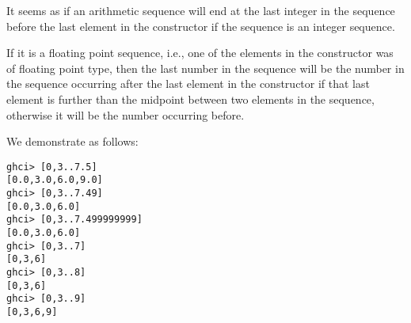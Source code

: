 
It seems as if an arithmetic sequence will end at the last 
integer in the sequence before the last element in the constructor if the 
sequence is an integer sequence.\par
\qquad If it is a floating point sequence, i.e., one of the elements in the 
constructor was of floating point type, then the last number in the sequence 
will be the number in the sequence occurring after the last element in the 
constructor if that last element is further than the midpoint between two 
elements in the sequence, otherwise it will be the number occurring before.\par
We demonstrate as follows:
\scriptsize\begin{verbatim}
ghci> [0,3..7.5]
[0.0,3.0,6.0,9.0]
ghci> [0,3..7.49]
[0.0,3.0,6.0]
ghci> [0,3..7.499999999]
[0.0,3.0,6.0]
ghci> [0,3..7]
[0,3,6]
ghci> [0,3..8]
[0,3,6]
ghci> [0,3..9]
[0,3,6,9]
\end{verbatim}\normalsize

